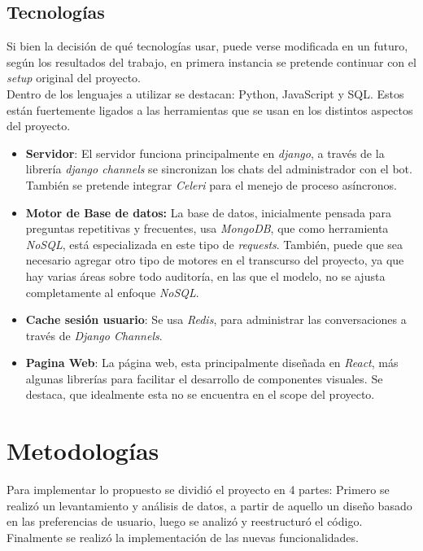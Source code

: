     \subsection{Tecnologías}
        Si bien la decisión de qué tecnologías usar, puede verse modificada en un futuro, según los resultados del trabajo, en primera instancia se pretende continuar con el \textit{setup} original del proyecto.\\
        Dentro de los lenguajes a utilizar se destacan: Python, JavaScript y SQL. Estos están fuertemente ligados a las herramientas que se usan en los distintos aspectos del proyecto.
        \begin{itemize}
            \item \textbf{Servidor}: El servidor funciona principalmente en \textit{django}, a través de la librería \textit{django channels} se sincronizan los chats del administrador con el bot. También se pretende integrar \textit{Celeri} para el menejo de proceso asíncronos.
            \item \textbf{Motor de Base de datos:} La base de datos, inicialmente pensada para preguntas repetitivas y frecuentes, usa \textit{MongoDB}, que como herramienta \textit{NoSQL}, está especializada en este tipo de \textit{requests}. También, puede que sea necesario agregar otro tipo de motores en el transcurso del proyecto, ya que hay varias áreas sobre todo auditoría, en las que el modelo, no se ajusta completamente al enfoque \textit{NoSQL}.
            \item \textbf{Cache sesión usuario}: Se usa \textit{Redis}, para administrar las conversaciones a través de \textit{Django Channels}.
            \item \textbf{Pagina Web}: La página web, esta principalmente diseñada en \textit{React}, más algunas librerías para facilitar el desarrollo de componentes visuales. Se destaca, que idealmente esta no se encuentra en el scope del proyecto.
        \end{itemize}

\section{Metodologías}\label{sec:intro-met}
    \par Para implementar lo propuesto se dividió el proyecto en 4 partes: Primero se realizó un levantamiento y análisis de datos, a partir de aquello un diseño basado en las preferencias de usuario, luego se analizó y reestructuró el código. Finalmente se realizó la implementación de las nuevas funcionalidades.

